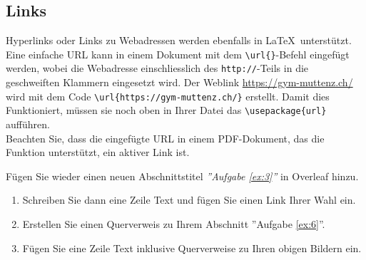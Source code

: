 \subsection{Links}
Hyperlinks oder Links zu Webadressen werden ebenfalls in \LaTeX\ unterstützt. Eine einfache URL kann in einem Dokument mit dem \verb|\url{}|-Befehl eingefügt werden, wobei die Webadresse einschliesslich des \texttt{http://}-Teils in die geschweiften Klammern eingesetzt wird. Der Weblink \url{https://gym-muttenz.ch/} wird mit dem Code \verb|\url{https://gym-muttenz.ch/}| erstellt. Damit dies Funktioniert, müssen sie noch oben in Ihrer Datei das \verb|\usepackage{url}| aufführen.\\Beachten Sie, dass die eingefügte URL in einem PDF-Dokument, das die Funktion unterstützt, ein aktiver Link ist.
\vspace{2mm}\\
\begin{ex} \label{ex:3}
Fügen Sie wieder einen neuen Abschnittstitel \emph{''Aufgabe \ref{ex:3}''}  in Overleaf hinzu.\\
\begin{enumerate}
	\item Schreiben Sie dann eine Zeile Text und fügen Sie einen Link Ihrer Wahl ein.
	\item Erstellen Sie einen Querverweis zu Ihrem Abschnitt  ''Aufgabe \ref{ex:6}''.
	\item Fügen Sie eine Zeile Text inklusive Querverweise zu Ihren obigen Bildern ein.
\end{enumerate}
\end{ex}